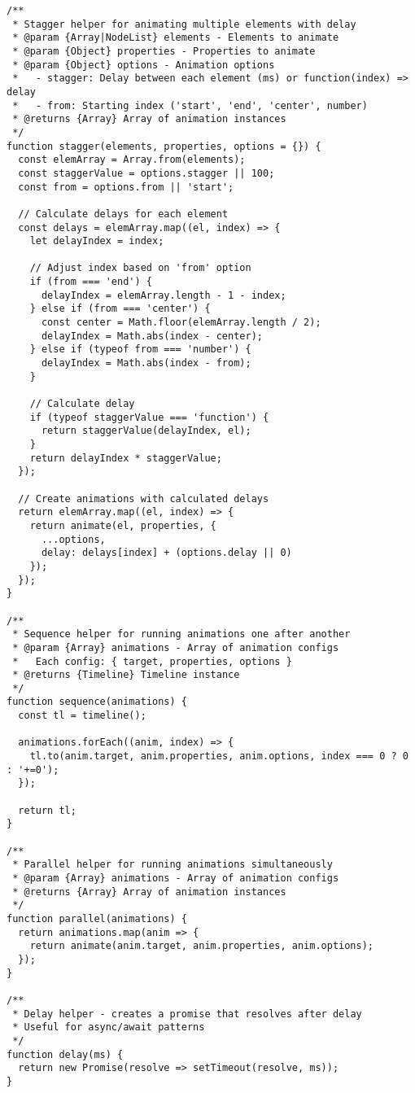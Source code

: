 \documentclass[11pt]{article}
\begin{document}
\begin{verbatim}
/**
 * Stagger helper for animating multiple elements with delay
 * @param {Array|NodeList} elements - Elements to animate
 * @param {Object} properties - Properties to animate
 * @param {Object} options - Animation options
 *   - stagger: Delay between each element (ms) or function(index) => delay
 *   - from: Starting index ('start', 'end', 'center', number)
 * @returns {Array} Array of animation instances
 */
function stagger(elements, properties, options = {}) {
  const elemArray = Array.from(elements);
  const staggerValue = options.stagger || 100;
  const from = options.from || 'start';
  
  // Calculate delays for each element
  const delays = elemArray.map((el, index) => {
    let delayIndex = index;
    
    // Adjust index based on 'from' option
    if (from === 'end') {
      delayIndex = elemArray.length - 1 - index;
    } else if (from === 'center') {
      const center = Math.floor(elemArray.length / 2);
      delayIndex = Math.abs(index - center);
    } else if (typeof from === 'number') {
      delayIndex = Math.abs(index - from);
    }
    
    // Calculate delay
    if (typeof staggerValue === 'function') {
      return staggerValue(delayIndex, el);
    }
    return delayIndex * staggerValue;
  });
  
  // Create animations with calculated delays
  return elemArray.map((el, index) => {
    return animate(el, properties, {
      ...options,
      delay: delays[index] + (options.delay || 0)
    });
  });
}

/**
 * Sequence helper for running animations one after another
 * @param {Array} animations - Array of animation configs
 *   Each config: { target, properties, options }
 * @returns {Timeline} Timeline instance
 */
function sequence(animations) {
  const tl = timeline();
  
  animations.forEach((anim, index) => {
    tl.to(anim.target, anim.properties, anim.options, index === 0 ? 0 : '+=0');
  });
  
  return tl;
}

/**
 * Parallel helper for running animations simultaneously
 * @param {Array} animations - Array of animation configs
 * @returns {Array} Array of animation instances
 */
function parallel(animations) {
  return animations.map(anim => {
    return animate(anim.target, anim.properties, anim.options);
  });
}

/**
 * Delay helper - creates a promise that resolves after delay
 * Useful for async/await patterns
 */
function delay(ms) {
  return new Promise(resolve => setTimeout(resolve, ms));
}


\end{verbatim}
\end{document}
